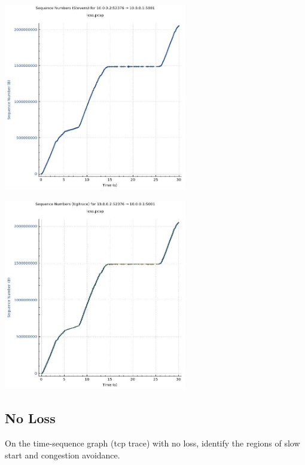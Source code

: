 \documentclass{article}
\begin{document}
    \includegraphics[width=8cm]{lossstevens}
    
    \includegraphics[width=8cm]{losstcptrace}

    \subsection*{No Loss}
    On the time-sequence graph (tcp trace) with no loss, identify the regions of slow start
and congestion avoidance.
\end{document}
